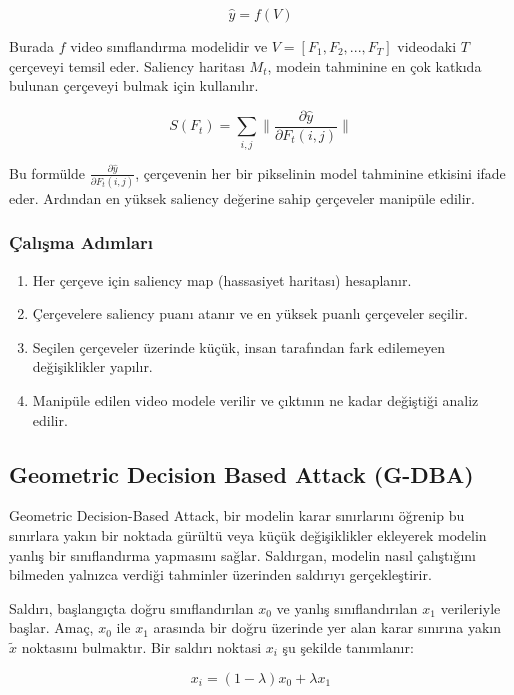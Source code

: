 \[ \hat{y} = f(V) \]

Burada $f$ video sınıflandırma modelidir ve $V = [F_1, F_2, ..., F_T]$ videodaki $T$ çerçeveyi temsil eder. Saliency haritası $M_t$, modein tahminine en çok katkıda bulunan çerçeveyi bulmak için kullanılır.

\[ S(F_t) = \sum_{i,j} \| \frac{\partial \hat{y}}{\partial F_t(i, j)} \| \]

Bu formülde $\frac{\partial \hat{y}}{\partial F_t(i, j)}$, çerçevenin her bir pikselinin model tahminine etkisini ifade eder. Ardından en yüksek saliency değerine sahip çerçeveler manipüle edilir.

\subsubsection{Çalışma Adımları}

\begin{enumerate}
    \item Her çerçeve için saliency map (hassasiyet haritası) hesaplanır. 
    \item Çerçevelere saliency puanı atanır ve en yüksek puanlı çerçeveler seçilir.
    \item Seçilen çerçeveler üzerinde küçük, insan tarafından fark edilemeyen değişiklikler yapılır.
    \item Manipüle edilen video modele verilir ve çıktının ne kadar değiştiği analiz edilir.
\end{enumerate}

\newpage

\subsection{Geometric Decision Based Attack (G-DBA)}

Geometric Decision-Based Attack, bir modelin karar sınırlarını öğrenip bu sınırlara yakın bir noktada gürültü veya küçük değişiklikler ekleyerek modelin yanlış bir sınıflandırma yapmasını sağlar. Saldırgan, modelin nasıl çalıştığını bilmeden yalnızca verdiği tahminler üzerinden saldırıyı gerçekleştirir.

Saldırı, başlangıçta doğru sınıflandırılan $x_0$ ve yanlış sınıflandırılan $x_1$ verileriyle başlar. Amaç, $x_0$ ile $x_1$ arasında bir doğru üzerinde yer alan karar sınırına yakın $\tilde{x}$ noktasını bulmaktır. Bir saldırı noktasi $x_i$ şu şekilde tanımlanır:

\[ x_i  = (1 - \lambda) x_0 + \lambda x_1 \]

